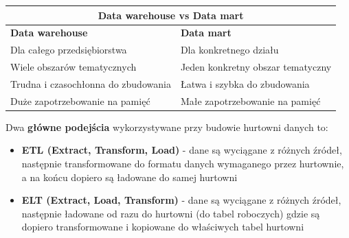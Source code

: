 \documentclass[a4paper]{article}
\begin{document}
    \begin{table}[H]
        \begin{center}
            \begin{tabular}{ |p{8cm}|p{8cm}| }
                \hline
                \multicolumn{2}{|c|}{\textbf{Data warehouse vs Data mart}} \\
                \hline
                \hline
                \textbf{Data warehouse}             & \textbf{Data mart}                \\
                \hline
                Dla całego przedsiębiorstwa         & Dla konkretnego działu            \\
                \hline
                Wiele obszarów tematycznych         & Jeden konkretny obszar tematyczny \\
                \hline
                Trudna i czasochłonna do zbudowania & Łatwa i szybka do zbudowania      \\
                \hline
                Duże zapotrzebowanie na pamięć      & Małe zapotrzebowanie na pamięć    \\
                \hline
            \end{tabular}
        \end{center}
    \end{table}

    Dwa \textbf{główne podejścia} wykorzystywane przy budowie hurtowni danych to:
    \begin{itemize}[noitemsep]
        \item \textbf{ETL (Extract, Transform, Load)} - dane są wyciągane z różnych źródeł, następnie transformowane do
        formatu danych wymaganego przez hurtownie, a na końcu dopiero są ładowane do samej hurtowni
        \item \textbf{ELT (Extract, Load, Transform)} - dane są wyciągane z różnych źródeł, następnie ładowane od razu
        do hurtowni (do tabel roboczych) gdzie są dopiero transformowane i kopiowane do właściwych tabel hurtowni
    \end{itemize}
\end{document}
